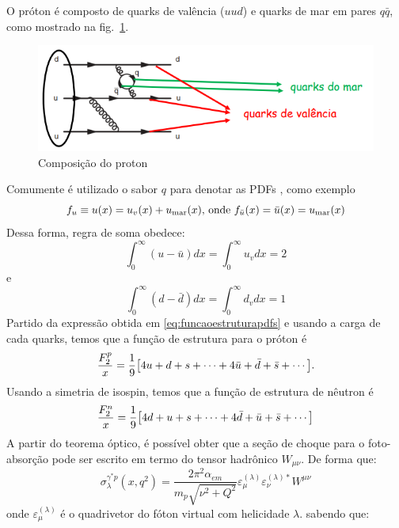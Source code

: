 O  próton é composto de quarks de valência ($uud$) e quarks de mar em pares $q\bar{q}$, como mostrado na fig.~\ref{fig:proton}.
\begin{figure}[h!]
    \centering
    \includegraphics[scale = 0.5]{screenshot/captura20240516011725.png}
    \caption{Composição do proton}
    \label{fig:proton}
\end{figure}
Comumente é utilizado o sabor $q$ para denotar as PDFs , como exemplo
\begin{equation}
    f_u \equiv u(x) = u_v(x) + u_\text{mar}(x) \text{, onde} ~ f_{\bar{u}}(x) = \Bar{u}(x) = u_\text{mar}(x)
\end{equation}
Dessa forma, regra de soma obedece:
\begin{equation}
    \int^\infty_0 (u - \bar{u}) dx =\int^\infty_0 u_v dx= 2
\end{equation}
e
\begin{equation} 
\int^\infty_0 (d - \bar{d}) dx = \int^\infty_0 d_v dx = 1
\end{equation}
Partido da expressão obtida em \eqref{eq:funcaoestruturapdfs} e usando a carga de cada quarks, temos que a função de estrutura para o próton é
\begin{equation}
        \frac{F_2^p}{x} = \frac{1}{9}\qty[4u + d + s + \cdots + 4\bar{u} + \bar{d} + \bar{s} + \cdots ] .
\end{equation}
Usando a simetria de isospin, temos que a função de estrutura de nêutron é 
\begin{equation}
        \frac{F_2^n}{x} = \frac{1}{9}\qty[4d + u + s + \cdots + 4\bar{d} + \bar{u} + \bar{s} + \cdots ]  
\end{equation}
A partir do teorema óptico, é possível obter que a seção de choque para o foto-absorção  pode ser escrito em termo do tensor hadrônico $W_{\mu\nu}$. De forma que:
\begin{equation}
    \sigma ^{\gamma^* p}_\lambda (x, q^2) = \frac{2\pi^2 \alpha_{em}}{m_p\sqrt{\nu^2 + Q^2}} \varepsilon^{(\lambda)}_\mu \varepsilon_\nu^{(\lambda)*} W^{\mu\nu}
\end{equation}
onde $\varepsilon^{(\lambda)}_\mu$ é o quadrivetor do fóton virtual com helicidade $\lambda$. sabendo que:
